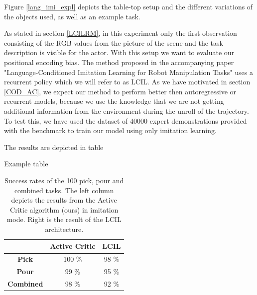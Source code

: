 Figure \ref{lang_imi_expl} depicts the table-top setup and the different variations of the objects used, as well as an example task.

As stated in section \ref{LCILRM}, in this experiment only the first observation consisting of the RGB values from the picture of the scene and the 
task description is visible for the actor. With this setup we want to evaluate our positional encoding bias. The method proposed in the accompanying 
paper "Language-Conditioned Imitation Learning for Robot Manipulation Tasks" uses a recurrent policy which we will refer to as LCIL. 
As we have motivated in section \ref{COD_AC}, 
we expect our method to perform better then autoregressive or recurrent models, because we use the knowledge that we are not getting additional information 
from the environment during the unroll of the trajectory. To test this, we have used the dataset of 40000 expert demonstrations provided 
with the benchmark to train our model using only imitation learning. 

The results are depicted in table

\begin{table}
    \centering
    \caption{Example table}
    \begin{tabular}{|c|c|c|}
        \cline{2-3}
        \multicolumn{1}{c|}{} & \textbf{Active Critic} & \textbf{LCIL} \\ \hline
        \textbf{Pick} & 100 \% & 98 \% \\ \hline
        \textbf{Pour} & 99 \% & 95 \% \\ \hline
        \textbf{Combined} & 98 \% & 92 \% \\ \hline
    \end{tabular}
    \caption{Success rates of the 100 pick, pour and combined tasks. The left column depicts the results from the Active Critic algorithm (ours) in 
    imitation mode. Right is the result of the LCIL architecture.}
\end{table}

